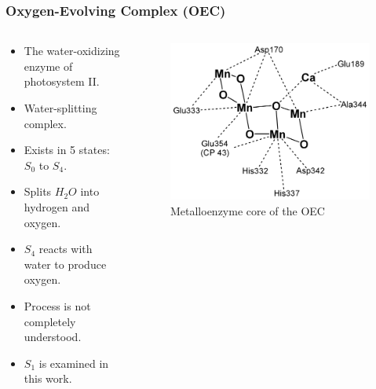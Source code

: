 \documentclass[10pt]{beamer}
\begin{document}
\begin{frame}
	\frametitle{Oxygen-Evolving Complex (OEC)}

	\begin{columns}[T]
		\begin{column}{.5\textwidth}
			\begin{itemize}
				\item The water-oxidizing enzyme of photosystem II.
				\item Water-splitting complex.
				\item Exists in 5 states: $S_{0}$ to $S_{4}$.
				\item Splits $H_{2}O$ into hydrogen and oxygen.
				\item $S_{4}$ reacts with water to produce oxygen.
				\item Process is not completely understood.
				\item $S_{1}$ is examined in this work.
			\end{itemize}
		\end{column}
		\begin{column}{.5\textwidth}
			\begin{figure}
				\includegraphics[width=1.0\textwidth,natwidth=620,natheight=485]{img/oec.png}
				\caption{Metalloenzyme core of the OEC}
			\end{figure}
		\end{column}
	\end{columns}

\end{frame}
\end{document}
